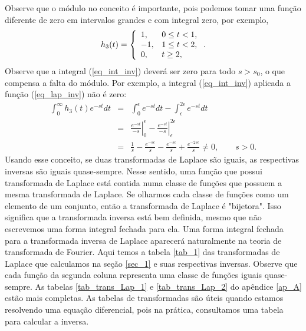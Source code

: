 Observe que o módulo no conceito é importante, pois podemos tomar uma função diferente de zero em intervalos grandes e com integral zero, por exemplo,
\begin{equation}{\label{eq_lap_inv}}
h_3(t)=\left\{\begin{array}{ll} 1,& 0\leq t< 1,\\-1,& 1\leq t< 2,\\0,& t\geq 2,  \end{array}\right..
\end{equation}
Observe que a integral (\ref{eq_int_inv}) deverá ser zero para todo $s>s_0$, o que compensa a falta do módulo. Por exemplo, a integral (\ref{eq_int_inv}) aplicada a função (\ref{eq_lap_inv}) não é zero:
\begin{eqnarray*}
\int_0^\infty h_3(t)e^{-st}dt&=&\int_0^\epsilon e^{-st}dt-\int_\epsilon^{2\epsilon} e^{-st}dt\\
&=&\left.\frac{ e^{-st}}{-s}\right|_0^\epsilon-\left.\frac{e^{-st}}{-s}\right|_{\epsilon}^{2\epsilon}\\
&=&\frac{1}{s}-\frac{ e^{-s\epsilon}}{s}-\frac{e^{-s\epsilon}}{s}+\frac{e^{-2s\epsilon}}{s}\neq 0,\qquad s>0.
\end{eqnarray*}
Usando esse conceito, se duas transformadas de Laplace são iguais, as respectivas inversas são iguais quase-sempre. Nesse sentido, uma função que possui transformada de Laplace está contida numa classe de funções que possuem a mesma transformada de Laplace. Se olharmos cada classe de funções como um elemento de um conjunto, então a transformada de Laplace é "bijetora". Isso significa que a transformada inversa está bem definida, mesmo que não escrevemos uma forma integral fechada para ela. Uma forma integral fechada para a transformada inversa de Laplace aparecerá naturalmente na teoria de transformada de Fourier.
Aqui temos a tabela \ref{tab_1} das transformadas de Laplace que calculamos na seção \ref{sec_1} e suas respectivas inversas. Observe que cada função da segunda coluna representa uma classe de funções iguais quase-sempre. As tabelas \ref{tab_trans_Lap_1} e \ref{tab_trans_Lap_2} do apêndice \ref{ap_A} estão mais completas. As tabelas de transformadas são úteis quando estamos resolvendo uma equação diferencial, pois na prática, consultamos uma tabela para calcular a inversa.
